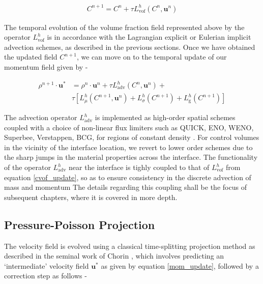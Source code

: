 \begin{align}
	C^{n+1} = C^{n} + \tau L^{h}_{\textrm{vof}}\left( C^{n},\boldsymbol{u}^{n}\right)  
\label{cvof_update}
\end{align}

The temporal evolution of the volume fraction field represented above by the 
operator $L^{h}_{\textrm{vof}}$ is in accordance with the Lagrangian explicit or Eulerian implicit 
advection schemes, as described in the previous sections. 
Once we have obtained the updated field $C^{n+1}$, we can move on to 
the temporal update of our momentum field given by -

\begin{align}
	\rho^{n+1}\cdot \boldsymbol{u}^{*} &= \rho^{n}\cdot \boldsymbol{u}^{n} + \tau L^{h}_{\textrm{adv}}\left( C^{n},\boldsymbol{u}^{n} \right) + \nonumber \\
				      & \tau \left[ L^{h}_{\mu}\left(C^{n+1},\boldsymbol{u}^{n}\right) + L^{h}_{\sigma}\left(C^{n+1}\right) + L^{h}_{\textrm{g}}\left(C^{n+1}\right)\right]
\label{mom_update}
\end{align}

The advection operator $L^{h}_{\textrm{adv}}$ is implemented as high-order spatial schemes 
coupled with a choice of non-linear flux limiters such as 
QUICK, ENO, WENO, Superbee, Verstappen, BCG, for regions of constant density
. 
For control volumes in the vicinity of the interface location, we revert to lower order
schemes due to the sharp jumps in the material properties across the interface.  
The functionality of the operator $L^{h}_{\textrm{adv}}$ near the interface is tighly coupled
to that of $L^{h}_{\textrm{vof}}$ from equation \ref{cvof_update}, 
so as to ensure consistency in the discrete advection of mass and momentum 
The details regarding this coupling shall be the focus 
of subsequent chapters, where it is covered in more depth.

\subsection*{Pressure-Poisson Projection}

The velocity field is evolved using a classical time-splitting projection method 
as described in the seminal work of Chorin \cite{chorin1969convergence}, 
which involves predicting an `intermediate' velocity field $\boldsymbol{u}^{*}$ 
as given by equation \ref{mom_update}, followed by a correction step as follows -       

